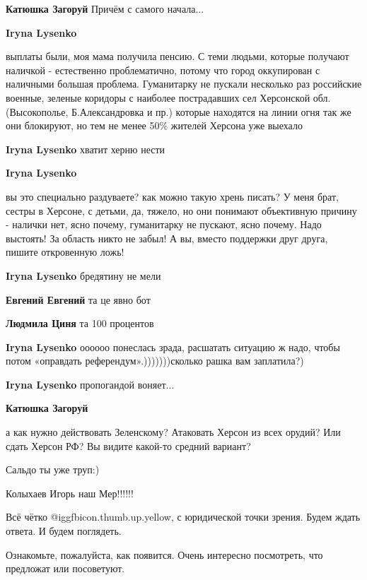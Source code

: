 \begin{itemize}
\begin{itemize}
\textbf{Катюшка Загоруй} Причём с самого начала...

\textbf{Iryna Lysenko} 

выплаты были, моя мама получила пенсию. С теми людьми, которые получают
наличкой - естественно проблематично, потому что город оккупирован с наличными
большая проблема. Гуманитарку не пускали несколько раз российские военные,
зеленые коридоры с наиболее пострадавших сел Херсонской обл. (Высокополье,
Б.Александровка и пр.) которые находятся на линии огня так же они блокируют, но
тем не менее 50\% жителей Херсона уже выехало

\textbf{Iryna Lysenko} хватит херню нести

\textbf{Iryna Lysenko} 

вы это специально раздуваете? как можно такую хрень писать? У меня брат, сестры
в Херсоне, с детьми, да, тяжело, но они понимают объективную причину - налички
нет, ясно почему, гуманитарку не пускают, ясно почему. Надо выстоять! За область
никто не забыл! А вы, вместо поддержки друг друга, пишите откровенную ложь!

\textbf{Iryna Lysenko} бредятину не мели

\textbf{Евгений Евгений} та це явно бот

\textbf{Людмила Циня} та 100 процентов

\textbf{Iryna Lysenko} оооооо понеслась зрада, расшатать ситуацию ж надо, чтобы потом «оправдать референдум».)))))))сколько рашка вам заплатила?)

\textbf{Iryna Lysenko} пропогандой воняет...

\textbf{Катюшка Загоруй} 

а как нужно действовать Зеленскому? Атаковать Херсон из всех орудий? Или сдать
Херсон РФ? Вы видите какой-то средний вариант?

\end{itemize} %

Сальдо ты уже труп:)

Колыхаев Игорь наш Мер!!!!!!


Всё чётко  @igg{fbicon.thumb.up.yellow}, с юридической точки зрения. Будем ждать ответа. И будем
поглядеть.

Ознакомьте, пожалуйста, как появится. Очень интересно посмотреть, что предложат
или посоветуют.


\end{itemize}
